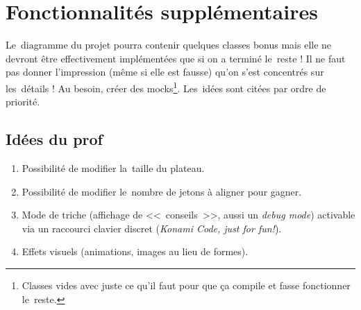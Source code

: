 \section{Fonctionnalités supplémentaires}
Le~diagramme du projet pourra contenir quelques classes bonus mais elle ne devront être effectivement implémentées que si on a terminé le~reste ! Il ne faut pas donner l'impression (même si elle est fausse) qu'on s'est concentrés sur les~détails ! Au besoin, créer des mocks\footnote{Classes vides avec juste ce qu'il faut pour que ça compile et fasse fonctionner le~reste.}. Les~idées sont citées par ordre de priorité.
\subsection{Idées du prof}
\begin{enumerate}
    \item Possibilité de modifier la~taille du plateau.
    \item Possibilité de modifier le~nombre de jetons à aligner pour gagner.
    \item Mode de triche (affichage de <<~conseils~>>, aussi un \textit{debug mode}) activable via un raccourci clavier discret (\textit{Konami Code, just for fun!}).
    \item Effets visuels (animations, images au lieu de formes).
\end{enumerate}
